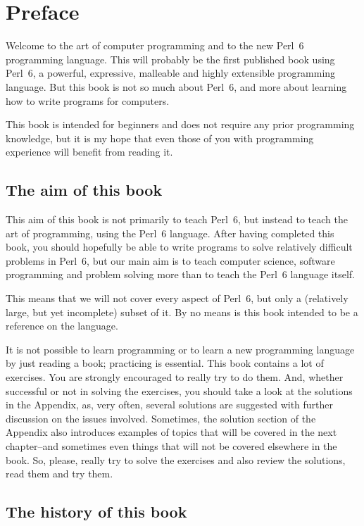 
\chapter{Preface}

Welcome to the art of computer programming and to the 
new Perl~6 programming language. This will probably be 
the first published book using Perl~6, 
a powerful, expressive, malleable and highly extensible 
programming language. But this book is not so much 
about Perl~6, and more about learning 
how to write programs for computers. 

This book is intended for beginners and does not require 
any prior programming knowledge, but it is my hope 
that even those of you with programming experience will 
benefit from reading it.

\section*{The aim of this book}

This aim of this book is not primarily to teach Perl~6, 
but instead to teach the art 
of programming, using the Perl~6 language. After having 
completed this book, you should hopefully be able 
to write programs to solve relatively difficult problems in 
Perl~6, but our main aim is to teach computer science, software 
programming and problem solving more than to teach the Perl~6 
language itself. 

This means that we will not cover every aspect of Perl~6, but 
only a (relatively large, but yet incomplete) subset of it. 
By no means is this book intended to be a reference on the 
language.

It is not possible to learn programming or to learn a new 
programming language by just reading a book; practicing 
is essential. This book contains a lot of exercises. You 
are strongly encouraged to really try to do them. And, 
whether successful or not in solving the exercises, you 
should take a look at the solutions in the Appendix, 
as, very often, several solutions are suggested with further 
discussion on the issues involved. Sometimes, the solution 
section of the Appendix also introduces examples of topics 
that will be covered in the next chapter--and sometimes even 
things that will not be covered elsewhere in the book. So, 
please, really try to solve the exercises and also review 
the solutions, read them and try them.


\section*{The history of this book}

